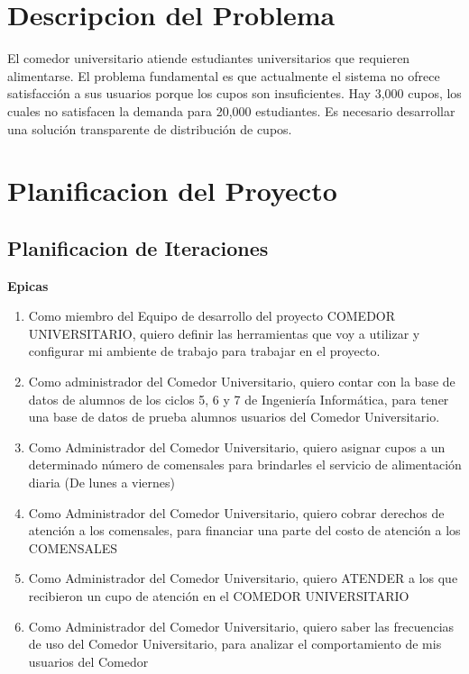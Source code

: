 \maketitle

\section{Descripcion del Problema}
El comedor universitario atiende estudiantes universitarios que requieren
alimentarse. El problema fundamental es que actualmente el sistema no ofrece
satisfacción a sus usuarios porque los cupos son insuficientes. Hay 3,000
cupos, los cuales no satisfacen la demanda para 20,000 estudiantes. Es
necesario desarrollar una solución transparente de distribución de cupos.

\section{Planificacion del Proyecto}
\subsection{Planificacion de Iteraciones}
\noindent\textbf{Epicas}\par
\begin{enumerate}
    \item Como miembro del Equipo de desarrollo del proyecto COMEDOR
        UNIVERSITARIO, quiero definir las herramientas que voy a utilizar y
        configurar mi ambiente de trabajo para trabajar en el proyecto.
    \item Como administrador del Comedor Universitario, quiero contar con la
        base de datos de alumnos de los ciclos 5, 6 y 7 de Ingeniería
        Informática, para tener una base de datos de prueba alumnos usuarios
        del Comedor Universitario.
    \item Como Administrador del Comedor Universitario, quiero asignar cupos a
        un determinado número de comensales para brindarles el servicio de
        alimentación diaria (De lunes a viernes)
    \item Como Administrador del Comedor Universitario, quiero cobrar derechos
        de atención a los comensales, para financiar una parte del costo de
        atención a los COMENSALES
    \item Como Administrador del Comedor Universitario, quiero ATENDER a los
        que recibieron un cupo de atención en el COMEDOR UNIVERSITARIO
    \item Como Administrador del Comedor Universitario, quiero saber las
        frecuencias de uso del Comedor Universitario, para analizar el
        comportamiento de mis usuarios del Comedor
\end{enumerate}

